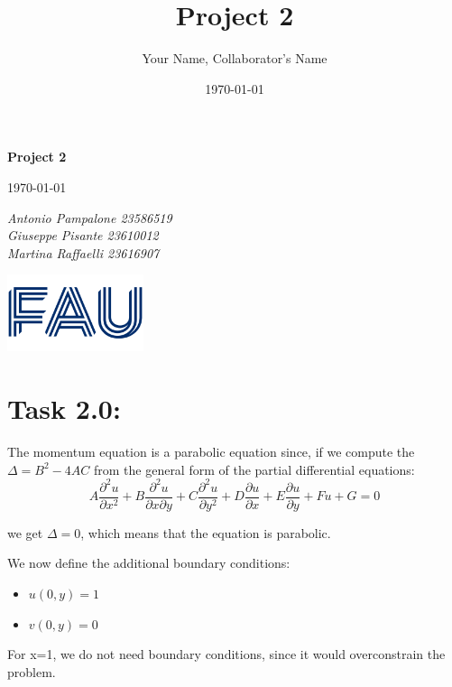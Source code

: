 \documentclass{article}
\title{Project 2}
\author{Your Name, Collaborator's Name}
\date{\today}
\begin{document}
\begin{titlepage}
    \centering
    \vspace*{1in}
    
    {\Huge\bfseries Project 2\par}
    \vspace{1.5cm}
    {\Large \today\par}
    \vspace{1.5cm}
    {\Large\itshape Antonio Pampalone 23586519 \\ Giuseppe Pisante 23610012\\ Martina Raffaelli 23616907 \par}
    
    \vfill
    \includegraphics[width=0.3\textwidth]{FAU-Logo.png}\par\vspace{1cm} %
   
\end{titlepage}

\newpage
\small

\section*{\Large Task 2.0:}
The momentum equation is a parabolic equation since, if we compute the $\Delta = B^2 - 4AC$ from the general form of the partial differential equations: 
\[
\]
\begin{equation}
  A \frac{\partial^2 u}{\partial x^2} + B \frac{\partial^2 u}{\partial x \partial y} + C \frac{\partial^2 u}{\partial y^2} + D \frac{\partial u}{\partial x} + E \frac{\partial u}{\partial y} + F u + G = 0
\end{equation}

we get $\Delta = 0$, which means that the equation is parabolic.

We now define the additional boundary conditions:
\begin{itemize}
  \item $u(0,y) = 1$
  \item $v(0,y) = 0$
\end{itemize}

For x=1, we do not need boundary conditions, since it would overconstrain the problem.
\end{document}
